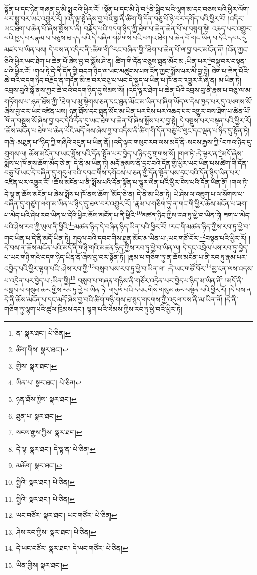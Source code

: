 སྟོན་པ་དང་ཉེན་གཞན་དུ་མི་སྨྲ་བའི་ཕྱིར་རོ། །སྟོན་པ་དང་མི་ཉེ་བ་\footnote{ན་  སྣར་ཐང་།  པེ་ཅིན། }ནི་སྒྲིབ་པའི་ལྷག་མ་དང་བཅས་པའི་ཕྱིར་ལོག་པར་སྨྲ་བར་ཡང་འགྱུར་རོ། །འདི་ལྟ་སྟེ་ཞེས་བྱ་བའི་སྒྲ་ནི་ཚིག་གི་དོན་བཅུ་པོ་ཉེ་བར་དགོད་པའི་ཕྱིར་རོ། །འདིར་ཡང་ཐེག་པ་ཆེན་པོ་ཞེས་སྨོས་པ་ནི། བརྗོད་པའི་བདག་ཉིད་ཀྱི་ཐེག་པ་ཆེན་ཆེན་པོ་ལ་བསྙག་སྟེ། འཆད་པར་འགྱུར་བའི་ཁྱད་པར་རྣམ་པ་བཅུས་ཐ་དད་པའི་དེ་བཞིན་གཤེགས་པའི་བཀའ་ཐེག་པ་ཆེན་པོ་གང་ཡིན་པ་དེའི་དབང་དུ་མཛད་པ་ཡིན་པས། དེ་བས་ན་འདིར་ནི་:ཚིག་གི་\footnote{ཚིག་གིས་  སྣར་ཐང་། }རང་བཞིན་གྱི་\footnote{གྱིས་  སྣར་ཐང་། }ཐེག་པ་ཆེན་པོ་ལ་བྱ་བར་མངོན་ནོ། །འོན་ཀྱང་ཅིའི་ཕྱིར་ཡང་ཐེག་པ་ཆེན་པོ་ཞེས་བྱ་བ་སྨོས་ཤེ་ན། ཚིག་གི་དོན་བཅུས་ཐུན་མོང་མ་:ཡིན་པར་\footnote{ཡིན་པ་  སྣར་ཐང་།  པེ་ཅིན། }བསྡུ་བར་བསྟན་པའི་ཕྱིར་རོ། །གལ་ཏེ་དེ་ནི་དོན་གྱི་བདག་ཉིད་ལ་ཡང་མཚུངས་པས་འོན་ཀྱང་སྨོས་པར་མི་བྱ་སྟེ། ཐེག་པ་ཆེན་པོའི་ཆེ་བའི་བདག་ཉིད་བརྗོད་ན་གདོན་མི་ཟ་བར་བཅུ་པ་ཡང་དེ་སྡུད་པ་ཡིན་པ་ཁོ་ནར་འགྱུར་རོ་ཞེ་ན། མ་ཡིན་ཏེ། འབྲས་བུའི་སྒོ་ནས་ཀྱང་ཆེ་བའི་བདག་ཉིད་དུ་སེམས་སོ། །འདི་ལྟར་ཐེག་པ་ཆེན་པོའི་འབྲས་བུ་ནི་རྣམ་པ་བཅུ་ལ་མ་གཏོགས་པ་:ཉན་ཐོས་ཀྱི་\footnote{ཉན་ཐོས་ཀྱིས་  སྣར་ཐང་། }ཐེག་པ་མུ་སྟེགས་ཅན་དང་ཐུན་མོང་མ་ཡིན་པ་ཞིག་ཡོད་ལ་དེས་ཁྱད་པར་དུ་འཕགས་སོ་ཞེས་བྱ་བར་ཡང་འཛིན་པས། ཉན་ཐོས་དང་ཐུན་མོང་མ་ཡིན་པར་ངེས་པར་འཆད་པར་འགྱུར་བས་ཐེག་པ་ཆེན་པོ་ཁོ་ན་བསྡུས་སོ་ཞེས་བྱ་བར་དེའི་དོན་དུ་ཡང་ཐེག་པ་ཆེན་པོ་ཞེས་སྨོས་པར་བྱ་སྟེ། དེ་བསྡུས་པར་བསྟན་པའི་ཕྱིར་རོ། །ཆོས་མངོན་པ་ཐེག་པ་ཆེན་པོའི་མདོ་ལས་ཞེས་བྱ་བ་འདིས་ནི་ཚིག་གི་དོན་བཅུ་པོ་ལུང་དང་ལྡན་པ་ཉིད་དུ་སྟོན་ཏེ། གཞི་:མཐུན་པ་\footnote{ཐུན་པ་  སྣར་ཐང་། }ཉིད་ཀྱི་གཞིའི་བདུན་པ་ཡིན་ནོ། །འདི་ལྟར་གསུང་རབ་ལས་མདོ་ནི་:སངས་རྒྱས་ཀྱི་\footnote{སངས་རྒྱས་ཀྱིས་  སྣར་ཐང་། }བཀའ་ཉིད་དུ་གྲགས་ལ། ཆོས་མངོན་པ་ཡང་སྨོས་པའི་དོན་སྟོན་པར་བྱེད་པ་ཉིད་དུ་གྲགས་སོ། །གལ་ཏེ་:དེ་ལྟར་ན་\footnote{དེ་ལྟ་  སྣར་ཐང་། དེ་ལྟ་ན་  པེ་ཅིན། }མདོ་ཞེས་སྨོས་པ་ཁོ་ནས་ཆོག་མོད་ཅེ་ན། དེ་ནི་མ་ཡིན་ཏེ། མདོ་རྣམས་ནི་དྲང་བའི་དོན་གྱི་ཕྱིར་ཡང་ཡིན་པས་ཚིག་གི་དོན་བཅུ་པོ་ཡང་དེ་བཞིན་དུ་གདུལ་བའི་དབང་གིས་དགོངས་པ་ཅན་གྱི་དོན་སྟོན་པས་དྲང་བའི་དོན་ཉིད་ཡིན་པར་འཛིན་པར་འགྱུར་རོ། །ཆོས་མངོན་པ་ནི་སྨོས་པའི་དོན་སྟོན་པ་ལྷུར་ལེན་པའི་ཕྱིར་ངེས་པའི་དོན་ཡིན་ནོ། །གལ་ཏེ་དེ་ལྟ་ན་ཆོས་མངོན་པ་ཞེས་སྨོས་པ་ཁོ་ནས་ཆོག་\footnote{མཆོག་  སྣར་ཐང་། }མོད་ཅེ་ན། དེ་ནི་མ་ཡིན་ཏེ། ཡེ་ཤེས་ལ་འཇུག་པ་ལ་སོགས་པ་བཞིན་དུ་གཙུག་ལག་མ་ཡིན་པ་ཉིད་དུ་ཐལ་བར་འགྱུར་རོ། །རྣམ་པ་གཅིག་ཏུ་ན་གང་གི་ཕྱིར་ཆོས་མངོན་པ་ཟག་པ་མེད་པའི་ཤེས་རབ་ཡིན་པ་དེའི་ཕྱིར་ཆོས་མངོན་པ་ནི་ཕྱིའི་\footnote{སྤྱིའི་  སྣར་ཐང་།  པེ་ཅིན། }མཚན་ཉིད་ཀྱིས་རབ་ཏུ་ཕྱེ་བ་ཡིན་ཏེ། ཟག་པ་མེད་པའི་ཤེས་རབ་ཀྱི་ཡུལ་ནི་ཕྱིའི་\footnote{སྤྱིའི་  སྣར་ཐང་།  པེ་ཅིན། }མཚན་ཉིད་དེ་བཞིན་ཉིད་ཡིན་པའི་ཕྱིར་རོ། །རང་གི་མཚན་ཉིད་ཀྱིས་རབ་ཏུ་ཕྱེ་བ་གང་ཡིན་པ་དེ་ནི་མདོ་ཡིན་ཏེ། གདུལ་བའི་དབང་གིས་ཐུན་མོང་མ་ཡིན་པ་:ཡང་གཙོ་བོར་\footnote{ཡང་བཙོར་  སྣར་ཐང་། ཡང་གཙོར་  པེ་ཅིན། }བསྟན་པའི་ཕྱིར་རོ། །དེ་བས་ན་ཆོས་མངོན་པའི་མདོ་ནི་གཉི་གའི་མཚན་ཉིད་ཀྱིས་རབ་ཏུ་ཕྱེ་བ་ཡིན་ལ། དེ་དང་འབྲེལ་པས་རབ་ཏུ་བྱེད་པ་ཡང་གཉི་གའི་བདག་ཉིད་ཡིན་ནོ་ཞེས་བྱ་བར་སྟོན་ཏོ། །རྣམ་པ་གཅིག་ཏུ་ན་ཆོས་མངོན་པ་ནི་རབ་ཏུ་རྣམ་པར་འབྱེད་པའི་ཕྱིར་ལྷག་པའི་:ཤེས་རབ་ཀྱི་\footnote{ཤེས་རབ་ཀྱིས་  སྣར་ཐང་།  པེ་ཅིན། }བསླབ་པས་རབ་ཏུ་ཕྱེ་བ་ཡིན་ལ། :དེ་ཡང་གཙོ་བོར་\footnote{དེ་ཡང་བཙོར་  སྣར་ཐང་། དེ་ཡང་གཙོར་  པེ་ཅིན། }མྱ་ངན་ལས་འདས་པ་འདྲེན་པར་བྱེད་པ་:ཡིན་གྱི།\footnote{ཡིན་གྱིས།  སྣར་ཐང་། } བསླབ་པ་གཞན་གཉིས་ནི་གཙོར་འདྲེན་པར་བྱེད་པ་ཉིད་མ་ཡིན་ནོ། །མདོ་ནི་བསླབ་པ་གསུམ་ཆར་གྱིས་རབ་ཏུ་ཕྱེ་བ་ཡིན་ཏེ། གདུལ་པའི་དབང་གིས་གསུམ་ཆར་བསྟན་པའི་ཕྱིར་རོ། །དེ་བས་ན་དེ་ནི་ཆོས་མངོན་པ་དང་མདོ་ཞེས་བྱ་བའི་ཚིག་གཉི་གས་ཐ་སྙད་གདགས་ཀྱི་འདུལ་བས་ནི་མ་ཡིན་ནོ། །དེ་ནི་གཅིག་ཏུ་ལྷག་པའི་ཚུལ་ཁྲིམས་དང་། ལྷག་པའི་སེམས་ཀྱིས་རབ་ཏུ་ཕྱེ་བའི་ཕྱིར་ཏེ། 